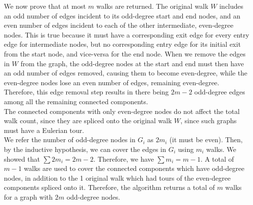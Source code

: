 \documentclass{article}
\begin{document}
\begin{enumerate}[label=(\alph*)]
We now prove that at most $m$ walks are returned. The original walk $W$ includes an odd number of edges incident to  its odd-degree start and end nodes, and an even number of edges incident to each of the other intermediate, even-degree nodes. This is true because it must have a corresponding exit edge for every entry edge for intermediate nodes, but no corresponding entry edge for its initial exit from the start node, and vice-versa for the end node. When we remove the edges in $W$ from the graph, the odd-degree nodes at the start and end must then have an odd number of edges removed, causing them to become even-degree, while the even-degree nodes lose an even number of edges, remaining even-degree. Therefore, this edge removal step results in there being $2m-2$ odd-degree edges among all the remaining connected components. \\

The connected components with only even-degree nodes do not affect the total walk count, since they are spliced onto the original walk $W$, since such graphs must have a Eulerian tour. \\

We refer the number of odd-degree nodes in $G_i$ as $2m_i$ (it must be even). Then, by the inductive hypothesis, we can cover the edges in $G_i$ using $m_i$ walks. We showed that $\sum 2m_i = 2m-2$. Therefore, we have  $\sum m_i = m-1$. A total of $m-1$ walks are used to cover the connected components which have odd-degree nodes, in addition to the 1 original walk which had tours of the even-degree components spliced onto it. Therefore, the algorithm returns a total of $m$ walks for a graph with $2m$ odd-degree nodes.
\end{enumerate}
\end{document}

